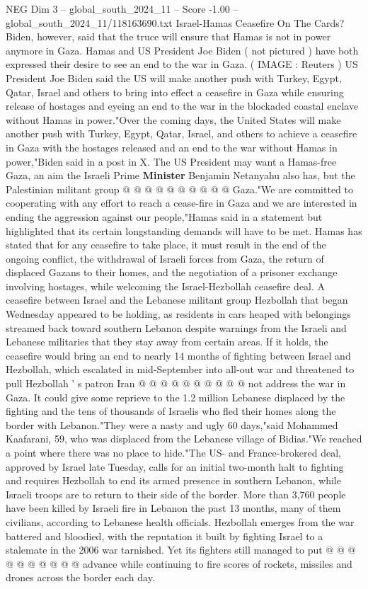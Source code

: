 \begin{textsample}{NEG Dim 3 – global\_south\_2024\_11 – Score -1.00 – global\_south\_2024\_11/118163690.txt}  \label{ex:f3_neg_138}
Israel-Hamas Ceasefire On The Cards?
Biden, however, said that the truce will ensure that Hamas is not in power anymore in Gaza.
Hamas and US President Joe Biden ( not pictured ) have both expressed their desire to see an end to the war in Gaza. ( IMAGE : Reuters ) US President Joe Biden said the US will make another push with Turkey, Egypt, Qatar, Israel and others to bring into effect a ceasefire in Gaza while ensuring release of hostages and eyeing an end to the war in the blockaded coastal enclave without Hamas in power."Over the coming days, the United States will make another push with Turkey, Egypt, Qatar, Israel, and others to achieve a ceasefire in Gaza with the hostages released and an end to the war without Hamas in power,"Biden said in a post in X.
The US President may want a Hamas-free Gaza, an aim the Israeli Prime \textbf{Minister} Benjamin Netanyahu also has, but the Palestinian militant group @ @ @ @ @ @ @ @ @ @ Gaza."We are committed to cooperating with any effort to reach a cease-fire in Gaza and we are interested in ending the aggression against our people,"Hamas said in a statement but highlighted that its certain longstanding demands will have to be met.
Hamas has stated that for any ceasefire to take place, it must result in the end of the ongoing conflict, the withdrawal of Israeli forces from Gaza, the return of displaced Gazans to their homes, and the negotiation of a prisoner exchange involving hostages, while welcoming the Israel-Hezbollah ceasefire deal.
A ceasefire between Israel and the Lebanese militant group Hezbollah that began Wednesday appeared to be holding, as residents in cars heaped with belongings streamed back toward southern Lebanon despite warnings from the Israeli and Lebanese militaries that they stay away from certain areas.
If it holds, the ceasefire would bring an end to nearly 14 months of fighting between Israel and Hezbollah, which escalated in mid-September into all-out war and threatened to pull Hezbollah ' s patron Iran @ @ @ @ @ @ @ @ @ @ not address the war in Gaza.
It could give some reprieve to the 1.2 million Lebanese displaced by the fighting and the tens of thousands of Israelis who fled their homes along the border with Lebanon."They were a nasty and ugly 60 days,"said Mohammed Kaafarani, 59, who was displaced from the Lebanese village of Bidias."We reached a point where there was no place to hide."The US- and France-brokered deal, approved by Israel late Tuesday, calls for an initial two-month halt to fighting and requires Hezbollah to end its armed presence in southern Lebanon, while Israeli troops are to return to their side of the border.
More than 3,760 people have been killed by Israeli fire in Lebanon the past 13 months, many of them civilians, according to Lebanese health officials.
Hezbollah emerges from the war battered and bloodied, with the reputation it built by fighting Israel to a stalemate in the 2006 war tarnished.
Yet its fighters still managed to put @ @ @ @ @ @ @ @ @ @ advance while continuing to fire scores of rockets, missiles and drones across the border each day.

\end{textsample}
